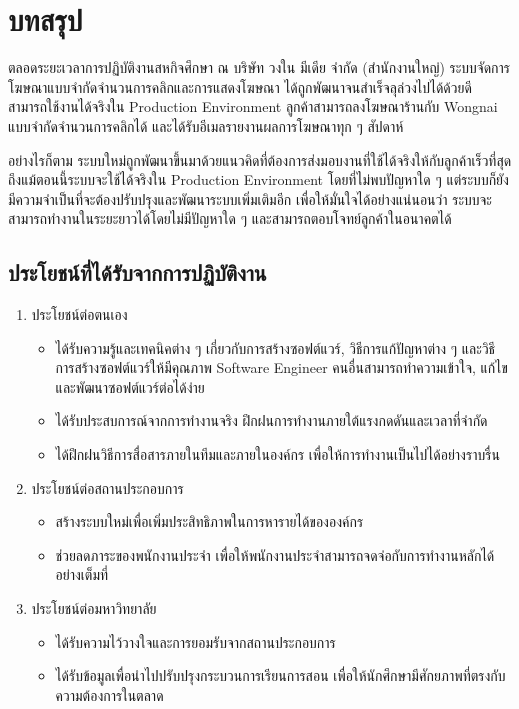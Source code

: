 \chapter{บทสรุป}
\label{chapter:conclusion}
ตลอดระยะเวลาการปฏิบัติงานสหกิจศึกษา ณ บริษัท วงใน มีเดีย จำกัด (สำนักงานใหญ่) ระบบจัดการโฆษณาแบบจำกัดจำนวนการคลิกและการแสดงโฆษณา ได้ถูกพัฒนาจนสำเร็จลุล่วงไปได้ด้วยดี สามารถใช้งานได้จริงใน Production Environment ลูกค้าสามารถลงโฆษณาร้านกับ Wongnai แบบจำกัดจำนวนการคลิกได้ และได้รับอีเมลรายงานผลการโฆษณาทุก ๆ สัปดาห์

อย่างไรก็ตาม ระบบใหม่ถูกพัฒนาขึ้นมาด้วยแนวคิดที่ต้องการส่งมอบงานที่ใช้ได้จริงให้กับลูกค้าเร็วที่สุด ถึงแม้ตอนนี้ระบบจะใช้ได้จริงใน Production Environment โดยที่ไม่พบปัญหาใด ๆ แต่ระบบก็ยังมีความจำเป็นที่จะต้องปรับปรุงและพัฒนาระบบเพิ่มเติมอีก เพื่อให้มั่นใจได้อย่างแน่นอนว่า ระบบจะสามารถทำงานในระยะยาวได้โดยไม่มีปัญหาใด ๆ และสามารถตอบโจทย์ลูกค้าในอนาคตได้

\section{ประโยชน์ที่ได้รับจากการปฏิบัติงาน}
\begin{enumerate}
	\item ประโยชน์ต่อตนเอง
	\begin{itemize}
		\item ได้รับความรู้และเทคนิคต่าง ๆ เกี่ยวกับการสร้างซอฟต์แวร์, วิธีการแก้ปัญหาต่าง ๆ และวิธีการสร้างซอฟต์แวร์ให้มีคุณภาพ Software Engineer คนอื่นสามารถทำความเข้าใจ, แก้ไข และพัฒนาซอฟต์แวร์ต่อได้ง่าย	
		\item ได้รับประสบการณ์จากการทำงานจริง ฝึกฝนการทำงานภายใต้แรงกดดันและเวลาที่จำกัด
		\item ได้ฝึกฝนวิธีการสื่อสารภายในทีมและภายในองค์กร เพื่อให้การทำงานเป็นไปได้อย่างราบรื่น
	\end{itemize}
	\item ประโยชน์ต่อสถานประกอบการ
	\begin{itemize}
		\item สร้างระบบใหม่เพื่อเพิ่มประสิทธิภาพในการหารายได้ขององค์กร
		\item ช่วยลดภาระของพนักงานประจำ เพื่อให้พนักงานประจำสามารถจดจ่อกับการทำงานหลักได้อย่างเต็มที่
	\end{itemize}
	\item ประโยชน์ต่อมหาวิทยาลัย
	\begin{itemize}
		\item ได้รับความไว้วางใจและการยอมรับจากสถานประกอบการ
		\item ได้รับข้อมูลเพื่อนำไปปรับปรุงกระบวนการเรียนการสอน เพื่อให้นักศึกษามีศักยภาพที่ตรงกับความต้องการในตลาด
	\end{itemize}
\end{enumerate}

